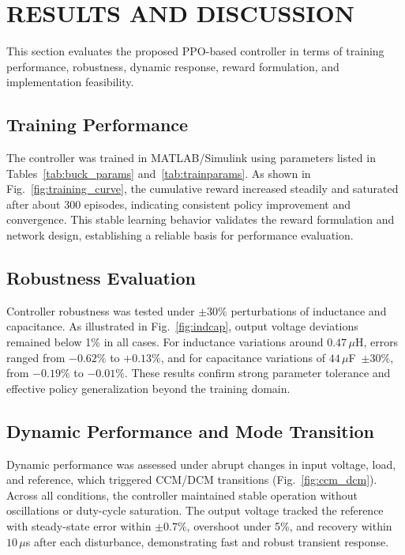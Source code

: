\documentclass[conference]{IEEEtran}
\begin{document}
\section{RESULTS AND DISCUSSION}

This section evaluates the proposed PPO-based controller in terms of training performance, robustness, dynamic response, reward formulation, and implementation feasibility.

\subsection{Training Performance}

The controller was trained in MATLAB/Simulink using parameters listed in Tables~\ref{tab:buck_params} and~\ref{tab:trainparams}. As shown in Fig.~\ref{fig:training_curve}, the cumulative reward increased steadily and saturated after about 300 episodes, indicating consistent policy improvement and convergence. This stable learning behavior validates the reward formulation and network design, establishing a reliable basis for performance evaluation.

\subsection{Robustness Evaluation}

Controller robustness was tested under $\pm30\%$ perturbations of inductance and capacitance. As illustrated in Fig.~\ref{fig:indcap}, output voltage deviations remained below 1\% in all cases. For inductance variations around $0.47\,\mu$H, errors ranged from $-0.62\%$ to $+0.13\%$, and for capacitance variations of $44\,\mu$F~$\pm30\%$, from $-0.19\%$ to $-0.01\%$. These results confirm strong parameter tolerance and effective policy generalization beyond the training domain.

\subsection{Dynamic Performance and Mode Transition}

Dynamic performance was assessed under abrupt changes in input voltage, load, and reference, which triggered CCM/DCM transitions (Fig.~\ref{fig:ccm_dcm}). Across all conditions, the controller maintained stable operation without oscillations or duty-cycle saturation. The output voltage tracked the reference with steady-state error within $\pm0.7\%$, overshoot under 5\%, and recovery within $10\,\mu$s after each disturbance, demonstrating fast and robust transient response.
\end{document}
